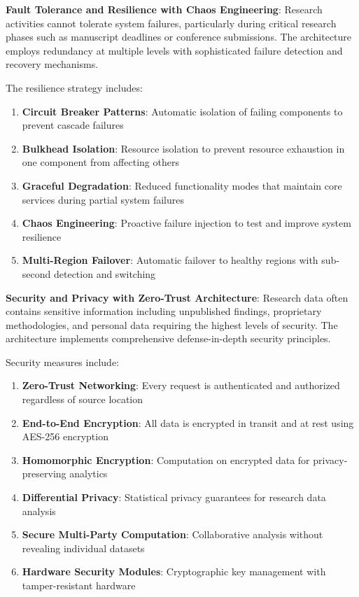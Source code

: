 \documentclass[10pt,twocolumn]{article}
\begin{document}
\textbf{Fault Tolerance and Resilience with Chaos Engineering}: Research activities cannot tolerate system failures, particularly during critical research phases such as manuscript deadlines or conference submissions. The architecture employs redundancy at multiple levels with sophisticated failure detection and recovery mechanisms.

The resilience strategy includes:
\begin{enumerate}
    \item \textbf{Circuit Breaker Patterns}: Automatic isolation of failing components to prevent cascade failures
    \item \textbf{Bulkhead Isolation}: Resource isolation to prevent resource exhaustion in one component from affecting others
    \item \textbf{Graceful Degradation}: Reduced functionality modes that maintain core services during partial system failures
    \item \textbf{Chaos Engineering}: Proactive failure injection to test and improve system resilience
    \item \textbf{Multi-Region Failover}: Automatic failover to healthy regions with sub-second detection and switching
\end{enumerate}

\textbf{Security and Privacy with Zero-Trust Architecture}: Research data often contains sensitive information including unpublished findings, proprietary methodologies, and personal data requiring the highest levels of security. The architecture implements comprehensive defense-in-depth security principles.

Security measures include:
\begin{enumerate}
    \item \textbf{Zero-Trust Networking}: Every request is authenticated and authorized regardless of source location
    \item \textbf{End-to-End Encryption}: All data is encrypted in transit and at rest using AES-256 encryption
    \item \textbf{Homomorphic Encryption}: Computation on encrypted data for privacy-preserving analytics
    \item \textbf{Differential Privacy}: Statistical privacy guarantees for research data analysis
    \item \textbf{Secure Multi-Party Computation}: Collaborative analysis without revealing individual datasets
    \item \textbf{Hardware Security Modules}: Cryptographic key management with tamper-resistant hardware
\end{enumerate}
\end{document}
